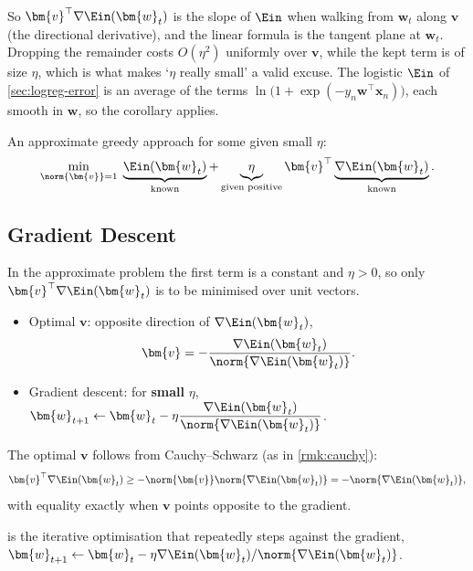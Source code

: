 So \(\bm{v}^\top \nabla \Ein(\bm{w}_t)\) is the slope of \(\Ein\) when walking
from \(\bm{w}_t\) along \(\bm{v}\) (the directional derivative), and the
linear formula is the tangent plane at \(\bm{w}_t\). Dropping the remainder
costs \(O(\eta^2)\) uniformly over \(\bm{v}\), while the kept term is of size
\(\eta\), which is what makes `\(\eta\) really small' a valid excuse. The
logistic \(\Ein\) of \autoref{sec:logreg-error} is an average of the terms
\(\ln \bigl( 1 + \exp(-y_n \bm{w}^\top \bm{x}_n) \bigr)\), each smooth in
\(\bm{w}\), so the corollary applies.

\begin{moral}
    An \textcolor{orange!85!black}{approximate} greedy approach for some given
    \textcolor{orange!85!black}{small} \(\eta\):
    \[
        \min_{\norm{\bm{v}} = 1} \;
        \underbrace{\Ein(\bm{w}_t)}_{\text{known}} +
        \underbrace{\eta}_{\text{given positive}}
        \bm{v}^\top \underbrace{\nabla \Ein(\bm{w}_t)}_{\text{known}} .
    \]
\end{moral}

\subsection{Gradient Descent}

In the approximate problem the first term is a constant and \(\eta > 0\), so
only \(\bm{v}^\top \nabla \Ein(\bm{w}_t)\) is to be minimised over unit
vectors.

\begin{itemize}
    \item Optimal \(\bm{v}\): opposite direction of \(\nabla \Ein(\bm{w}_t)\),
        \[
            \bm{v} = - \frac{\nabla \Ein(\bm{w}_t)}{\norm{\nabla
            \Ein(\bm{w}_t)}} .
        \]
    \item Gradient descent: for \textbf{small} \(\eta\),
        \(\displaystyle \bm{w}_{t+1} \gets \bm{w}_t - \eta \frac{\nabla
        \Ein(\bm{w}_t)}{\norm{\nabla \Ein(\bm{w}_t)}}\).
\end{itemize}

The optimal \(\bm{v}\) follows from Cauchy--Schwarz (as in
\autoref{rmk:cauchy}):
\[
    \bm{v}^\top \nabla \Ein(\bm{w}_t) \ge -\norm{\bm{v}} \norm{\nabla
    \Ein(\bm{w}_t)} = -\norm{\nabla \Ein(\bm{w}_t)} ,
\]
with equality exactly when \(\bm{v}\) points opposite to the gradient.

\begin{definition}\label{def:gd}
     is the iterative optimisation that repeatedly
    steps against the gradient, \(\bm{w}_{t+1} \gets \bm{w}_t - \eta \nabla
    \Ein(\bm{w}_t) / \norm{\nabla \Ein(\bm{w}_t)}\).
\end{definition}

